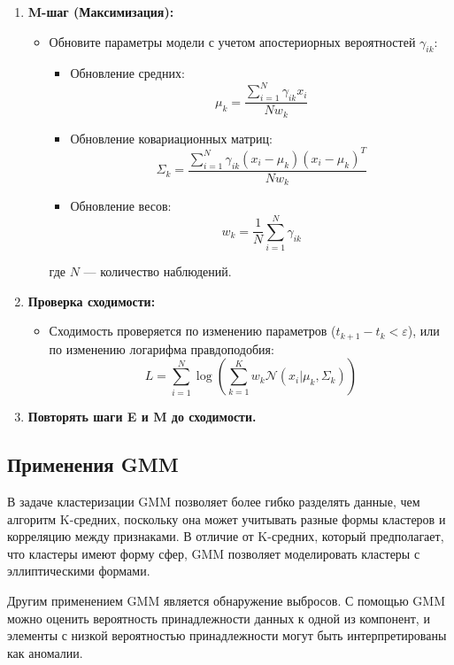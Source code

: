 \begin{enumerate}
    \item \textbf{M-шаг (Максимизация):}
    \begin{itemize}
        \item Обновите параметры модели с учетом апостериорных вероятностей $\gamma_{ik}$:
        \begin{itemize}
            \item Обновление средних:
            \[
            \mu_k = \frac{\sum_{i=1}^{N} \gamma_{ik} x_i}{Nw_k}
            \]
            \item Обновление ковариационных матриц:
            \[
            \Sigma_k = \frac{\sum_{i=1}^{N} \gamma_{ik} (x_i - \mu_k)(x_i - \mu_k)^T}{Nw_k}
            \]
            \item Обновление весов:
            \[
            w_k = \frac{1}{N} \sum_{i=1}^{N} \gamma_{ik}
            \]
        \end{itemize}
        где $N$ — количество наблюдений.
    \end{itemize}

    \item \textbf{Проверка сходимости:}
    \begin{itemize}
        \item Сходимость проверяется по изменению параметров ($t_{k+1} - t_k < \varepsilon$), или по изменению логарифма правдоподобия:
        \[
        L = \sum_{i=1}^{N} \log \left( \sum_{k=1}^{K} w_k \mathcal{N}(x_i | \mu_k, \Sigma_k) \right)
        \]

    \end{itemize}

    \item \textbf{Повторять шаги E и M до сходимости.}
\end{enumerate}


\subsection{Применения GMM}

В задаче кластеризации GMM позволяет более гибко разделять данные, чем алгоритм K-средних, поскольку она может учитывать разные формы кластеров и корреляцию между признаками. В отличие от K-средних, который предполагает, что кластеры имеют форму сфер, GMM позволяет моделировать кластеры с эллиптическими формами.

Другим применением GMM является обнаружение выбросов. С помощью GMM можно оценить вероятность принадлежности данных к одной из компонент, и элементы с низкой вероятностью принадлежности могут быть интерпретированы как аномалии.

